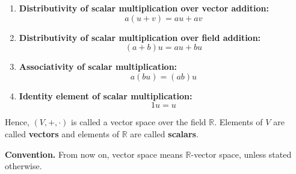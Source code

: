 \begin{definition}
\begin{enumerate}
		\item \textbf{Distributivity of scalar multiplication over vector addition:}
		      \begin{equation}
			      a(u+v)=au+av
			      \label{eq:r-vector-space-7}
		      \end{equation}

		\item \textbf{Distributivity of scalar multiplication over field addition:}
		      \begin{equation}
			      (a+b)u=au+bu
			      \label{eq:r-vector-space-8}
		      \end{equation}

		\item \textbf{Associativity of scalar multiplication:}
		      \begin{equation}
			      a(bu)=(ab)u
			      \label{eq:r-vector-space-9}
		      \end{equation}

		\item \textbf{Identity element of scalar multiplication:}
		      \begin{equation}
			      1u=u
			      \label{eq:r-vector-space-10}
		      \end{equation}

	\end{enumerate}

	Hence, $(V,+,\cdot)$ is called a vector space over the field $\mathbb{R}$. Elements of \( V \) are called \textbf{vectors} and elements of \( \mathbb{R} \) are called \textbf{scalars}.
\end{definition}

\textbf{Convention.} From now on, vector space means \( \mathbb{R} \)-vector space, unless stated otherwise.

